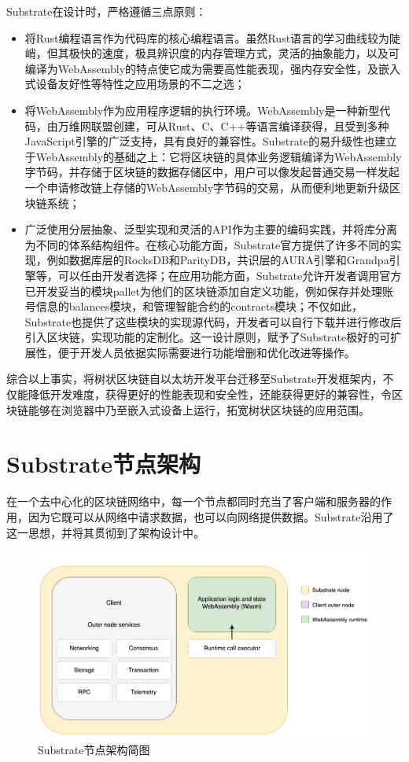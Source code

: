 Substrate在设计时，严格遵循三点原则：

\begin{itemize}
    \item 将Rust编程语言作为代码库的核心编程语言。虽然Rust语言的学习曲线较为陡峭，但其极快的速度，极具辨识度的内存管理方式，灵活的抽象能力，以及可编译为WebAssembly的特点使它成为需要高性能表现，强内存安全性，及嵌入式设备友好性等特性之应用场景的不二之选；
    \item 将WebAssembly作为应用程序逻辑的执行环境。WebAssembly是一种新型代码，由万维网联盟创建，可从Rust、C、C++等语言编译获得，且受到多种JavaScript引擎的广泛支持，具有良好的兼容性\cite{wasmIntro}。Substrate的易升级性也建立于WebAssembly的基础之上：它将区块链的具体业务逻辑编译为WebAssembly字节码，并存储于区块链的数据存储区中，用户可以像发起普通交易一样发起一个申请修改链上存储的WebAssembly字节码的交易，从而便利地更新升级区块链系统；
    \item 广泛使用分层抽象、泛型实现和灵活的API作为主要的编码实践，并将库分离为不同的体系结构组件。在核心功能方面，Substrate官方提供了许多不同的实现，例如数据库层的RocksDB和ParityDB，共识层的AURA引擎和Grandpa引擎等，可以任由开发者选择；在应用功能方面，Substrate允许开发者调用官方已开发妥当的模块pallet为他们的区块链添加自定义功能，例如保存并处理账号信息的balances模块，和管理智能合约的contracts模块；不仅如此，Substrate也提供了这些模块的实现源代码，开发者可以自行下载并进行修改后引入区块链，实现功能的定制化。这一设计原则，赋予了Substrate极好的可扩展性，便于开发人员依据实际需要进行功能增删和优化改进等操作。
\end{itemize}

综合以上事实，将树状区块链自以太坊开发平台迁移至Substrate开发框架内，不仅能降低开发难度，获得更好的性能表现和安全性，还能获得更好的兼容性，令区块链能够在浏览器中乃至嵌入式设备上运行，拓宽树状区块链的应用范围。

\section{Substrate节点架构}

在一个去中心化的区块链网络中，每一个节点都同时充当了客户端和服务器的作用，因为它既可以从网络中请求数据，也可以向网络提供数据。Substrate沿用了这一思想，并将其贯彻到了架构设计中。

\begin{figure}[htbp]
    \centering
    \includegraphics[width=\textwidth]{images/simplified-architecture.png}
    \caption{Substrate节点架构简图}\label{Substrate节点架构简图} %
\end{figure}

